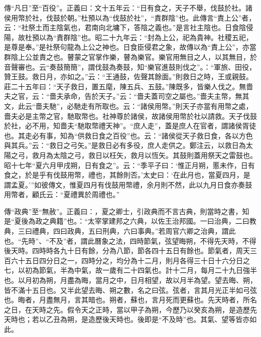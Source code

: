 {\noindent\zhuan{}\fzbyks 傳“凡日”至“百役”。正義曰：文十五年云：“日有食之，天子不舉，伐鼓於社。諸侯用幣於社，伐鼓於朝。”杜預以為“伐鼓於社”，“責群陰”也。此傳言“責上公”者，云：“社祭土而主陰氣也，君南向北墉下，答陰之義也。”是言社主陰也。日食陰侵陽，故杜預以為“責群陰”也。昭二十九年云：“封為上公，祀為貴神。社稷五祀，是尊是奉。”是社祭句龍為上公之神也。日食臣侵君之象，故傳以為“責上公”，亦當群陰上公並責之也。瞽蒙之官掌作樂，瞽為樂官。樂官用無目之人，以其無目，於音聲審也。云“奏鼓簡簡”，謂伐鼓為奏鼓，知“樂官進鼓則伐之”。：“軍旅、田役，贊王鼓。救日月，亦如之。”云：“王通鼓，佐聲其餘面。”則救日之時，王或親鼓。莊二十五年曰：“天子救日，置五麾，陳五兵、五鼓。”陳既多，皆樂人伐之。無嗇夫之官，云：“嗇夫承命，告於天子。”云：“嗇夫蓋司空之屬也。”嗇夫主幣，無其文，此云“嗇夫馳”，必馳走有所取也。云：“諸侯用幣。”則天子亦當有用幣之處，嗇夫必是主幣之官，馳取幣也。社神尊於諸侯，故諸侯用幣於社以請救。天子伐鼓於社，必不用，知嗇夫“馳取幣禮天神”。“庶人走”，蓋是庶人在官者，謂諸侯胥徒也。其走必有事，知為“供救日食之百役”也。云：“諸侯從天子救日食，各以方色與其兵。”云：“救日之弓矢。”是救日必有多役，庶人走供之。鄭注云，以救日為太陽之弓，救月為太陰之弓，救日以枉矢，救月以恆矢。其鼓則蓋用祭天之雷鼓也。昭十七年“夏六月甲戌朔，日有食之”。云：“季平子曰：‘惟正月朔，慝未作，日有食之，於是乎有伐鼓用幣，禮也，其餘則否。’太史曰：‘在此月也，當夏四月，是謂孟夏。’”如彼傳文，惟夏四月有伐鼓用幣禮，余月則不然，此以九月日食亦奏鼓用幣者，顧氏云：“夏禮異於周禮也。” \par}

{\noindent\zhuan{}\fzbyks 傳“政典”至“無赦”。正義曰：，夏之卿士，引政典而不言古典，則當時之書，知是“夏後為政之典籍”也。：“太宰掌建邦之六典，以佐王治邦國。一曰治典，二曰教典，三曰禮典，四曰政典，五曰刑典，六曰事典。”若周官六卿之治典，謂此也。“先時”、“不及”者，謂此曆象之法，四時節氣，弦望晦朔，不得先天時，不得後天時。四時時各九十日有餘，分為八節，節各四十五日有餘也。節氣者，周天三百六十五日四分日之一，四時分之，均分為十二月，則月各得三十日十六分日之七，以初為節氣，半為中氣，故一歲有二十四氣也。計十二月，每月二十九日強半也。以月初為朔，月盡為晦，當月之中，日月相望，故以月半為望。望去晦、朔，皆不滿十五日也。又半此望去晦、朔之數，名之曰弦。弦者，言其月光正半如弓弦也。晦者，月盡無月，言其暗也。朔者，蘇也，言月死而更蘇也。先天時者，所名之日，在天時之先。假令天之正時，當以甲子為朔，今歷乃以癸亥為朔，是造歷先天時也；若以乙丑為朔，是造歷後天時也。後即是“不及時”也。其氣、望等皆亦如此。 \par}

